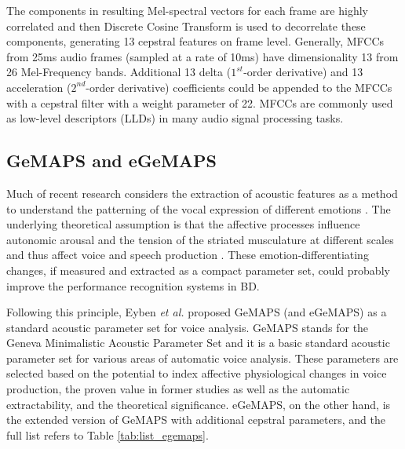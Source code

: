 The components in resulting Mel-spectral vectors for each frame are highly correlated and then Discrete Cosine Transform is used to decorrelate these components, generating 13 cepstral features on frame level. Generally, MFCCs from 25ms audio frames (sampled at a rate of 10ms) have dimensionality 13 from 26 Mel-Frequency bands. Additional 13 delta ($1^{st}$-order derivative) and 13 acceleration ($2^{nd}$-order derivative) coefficients could be appended to the MFCCs with a cepstral filter with a weight parameter of 22. MFCCs are commonly used as low-level descriptors (LLDs) in many audio signal processing tasks.




\subsection{GeMAPS and eGeMAPS}

Much of recent research considers the extraction of acoustic features as a method to understand the patterning of the vocal expression of different emotions \cite{juslin2001, yildirim2004, eyben2015}. The underlying theoretical assumption is that the affective processes influence autonomic arousal and the tension of the striated musculature at different scales and thus affect voice and speech production \cite{scherer1986}. These emotion-differentiating changes, if measured and extracted as a compact parameter set, could probably improve the performance recognition systems in BD.

Following this principle, Eyben \textit{et al.} proposed GeMAPS (and eGeMAPS) as a standard acoustic parameter set for voice analysis. GeMAPS stands for the Geneva Minimalistic Acoustic Parameter Set and it is a basic standard acoustic parameter set for various areas of automatic voice analysis. These parameters are selected based on the potential to index affective physiological changes in voice production, the proven value in former studies as well as the automatic extractability, and the theoretical significance. eGeMAPS, on the other hand, is the extended version of GeMAPS with additional cepstral parameters, and the full list refers to Table \ref{tab:list_egemaps}.

